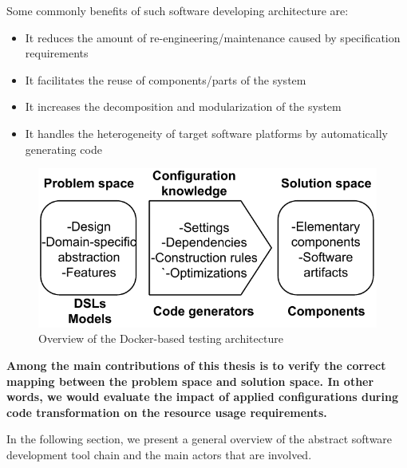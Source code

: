 Some commonly benefits of such software developing architecture are:
\begin{itemize}
\item It reduces the amount of re-engineering/maintenance caused by specification requirements
\item It facilitates the reuse of components/parts of the system
\item It increases the decomposition and modularization of the system
\item It handles the heterogeneity of target software platforms by automatically generating code
\end{itemize}
\begin{figure}[h]
	\center
	\includegraphics[scale=0.65]{Background/fig/GDM.pdf}
	\caption{Overview of the Docker-based testing architecture}
\end{figure}

\textbf{Among the main contributions of this thesis is to verify the correct mapping between the problem space and solution space. In other words, we would evaluate the impact of applied configurations during code transformation on the resource usage requirements.
}

In the following section, we present a general overview of the abstract software development tool chain and the main actors that are involved.

